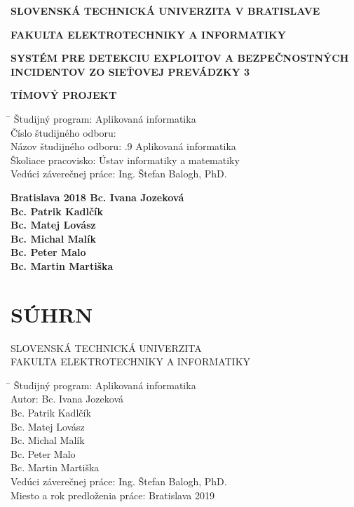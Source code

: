 \documentclass[a4paper,12pt]{article}
\begin{document}
\begin{titlepage}
	\centering
	
	{\bfseries SLOVENSKÁ TECHNICKÁ UNIVERZITA  V BRATISLAVE\par}
	{\bfseries FAKULTA ELEKTROTECHNIKY A INFORMATIKY\par}
	\vspace{8cm}
	{\bfseries SYSTÉM PRE DETEKCIU EXPLOITOV A BEZPEČNOSTNÝCH INCIDENTOV ZO SIEŤOVEJ PREVÁDZKY 3\par}
	\vspace{0.5cm}
	{\bfseries TÍMOVÝ PROJEKT\par}
	
	\vspace{\fill}
	\begin{tabbing}
		\hspace*{5cm}\= \kill
		Študijný program: \> Aplikovaná informatika \\
		Číslo študijného odboru:  \\
		Názov študijného odboru: .9 Aplikovaná informatika \\
		Školiace pracovisko: \> Ústav informatiky a matematiky \\
		Vedúci záverečnej práce: \> Ing. Štefan Balogh, PhD. \\
	\end{tabbing}
	\vspace{\fill}
	
	{\bfseries Bratislava 2018 	\hfill \bfseries {Bc. Ivana Jozeková}} \\
	{ \hfill \bfseries {Bc. Patrik Kadlčík}} \\
	{ \hfill \bfseries {Bc. Matej Lovász}} \\
	{ \hfill \bfseries {Bc. Michal Malík}} \\ 
	{ \hfill \bfseries {Bc. Peter Malo}} \\
	{ \hfill \bfseries {Bc. Martin Martiška}}
	
\end{titlepage}
\newpage

\section*{SÚHRN}
\pagestyle{empty}
SLOVENSKÁ TECHNICKÁ UNIVERZITA \\
FAKULTA ELEKTROTECHNIKY A INFORMATIKY 

\begin{tabbing} 
	\hspace*{7cm}\= \kill
	Študijný program:\> Aplikovaná informatika \\
	Autor:\> Bc. Ivana Jozeková \\
			\> Bc. Patrik Kadlčík \\
			\> Bc. Matej Lovász \\
			\> Bc. Michal Malík \\
			\> Bc. Peter Malo \\
			\> Bc. Martin Martiška \\
	Vedúci záverečnej práce:\> Ing. Štefan Balogh, PhD. \\
	Miesto a rok predloženia práce:\> Bratislava 2019
\end{tabbing}
\end{document}
